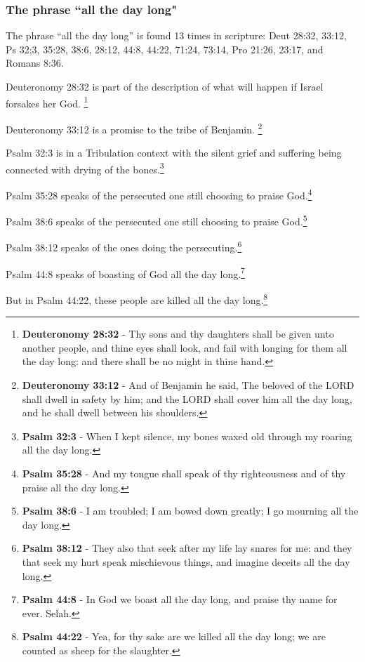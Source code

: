 \subsubsection{The phrase ``all the day long"}

The  phrase ``all the day long'' is found 13 times in scripture: Deut 28:32, 33:12, Ps 32;3, 35:28, 38:6, 28:12, 44:8, 44:22, 71:24, 73:14, Pro 21:26, 23:17, and Romans 8:36.

\begin{compactenum}
    \item Deuteronomy 28:32 is part of the description of what will happen if Israel forsakes  her God. \footnote{\textbf{Deuteronomy 28:32} - Thy sons and thy daughters shall be given unto another people, and thine eyes shall look, and fail with longing for them all the day long: and there shall be no might in thine hand.}
    \item Deuteronomy 33:12 is a promise to the tribe of Benjamin. \footnote{\textbf{Deuteronomy 33:12} - And of Benjamin he said, The beloved of the LORD shall dwell in safety by him; and the LORD shall cover him all the day long, and he shall dwell between his shoulders.}
    \item Psalm 32:3 is in a Tribulation context with the silent grief and suffering being connected with drying of the bones.\footnote{\textbf{Psalm 32:3} - When I kept silence, my bones waxed old through my roaring all the day long.}
    \item Psalm 35:28 speaks of the persecuted one still choosing to praise God.\footnote{\textbf{Psalm 35:28} - And my tongue shall speak of thy righteousness and of thy praise all the day long.}
    \item Psalm 38:6 speaks of the persecuted one still choosing to praise God.\footnote{\textbf{Psalm 38:6} - I am troubled; I am bowed down greatly; I go mourning all the day long.}
    \item Psalm 38:12 speaks of the ones doing the persecuting.\footnote{\textbf{Psalm 38:12} - They also that seek after my life lay snares for me: and they that seek my hurt speak mischievous things, and imagine deceits all the day long.}
    \item Psalm 44:8 speaks of boasting of God all the day long.\footnote{\textbf{Psalm 44:8} - In God we boast all the day long, and praise thy name for ever. Selah.}
    \item But in Psalm 44:22, these people are killed all the day long.\footnote{\textbf{Psalm 44:22} - Yea, for thy sake are we killed all the day long; we are counted as sheep for the slaughter.}

\end{compactenum}
